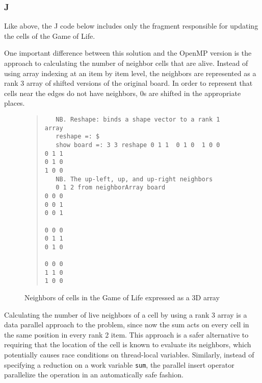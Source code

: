 \subsubsection{J}
Like above, the J code below includes only the fragment responsible for updating the cells of the Game of Life. 

\begin{singlespacing}
\begin{small}

\end{small}
\end{singlespacing}

\noindent One important difference between this solution and the OpenMP version is 
the approach to calculating the number of neighbor cells that are alive.
Instead of using array indexing at an item by item level, 
the neighbors are represented as a rank 3 array of shifted versions of the original board. 
In order to represent that cells near the edges do not have neighbors, 
0s are shifted in the appropriate places.

\begin{figure}
\begin{quote}
\begin{singlespacing}
\begin{small}
\begin{verbatim}
   NB. Reshape: binds a shape vector to a rank 1 array
   reshape =: $
   show board =: 3 3 reshape 0 1 1  0 1 0  1 0 0
0 1 1
0 1 0
1 0 0
   NB. The up-left, up, and up-right neighbors
   0 1 2 from neighborArray board 
0 0 0
0 0 1
0 0 1

0 0 0
0 1 1
0 1 0

0 0 0
1 1 0
1 0 0
\end{verbatim}
\end{small}
\end{singlespacing}
\end{quote}
\caption{Neighbors of cells in the Game of Life expressed as a 3D array}
\label{fig::gol_nei}
\end{figure}

Calculating the number of live neighbors of a cell by using a rank 3 array 
is a data parallel approach to the problem, 
since now the sum acts on every cell in the same position in every rank 2 item. 
This approach is a safer alternative to requiring 
that the location of the cell is known to evaluate its neighbors, 
which potentially causes race conditions on thread-local variables.
Similarly, instead of specifying a reduction on a work variable \texttt{sum},
the parallel insert operator parallelize the operation in an automatically safe fashion.

